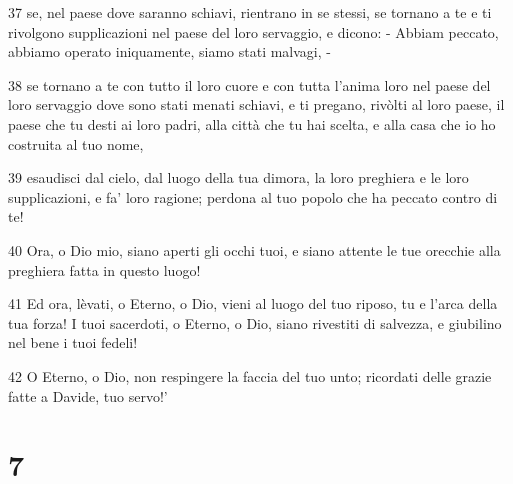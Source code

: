 \par 37 se, nel paese dove saranno schiavi, rientrano in se stessi, se tornano a te e ti rivolgono supplicazioni nel paese del loro servaggio, e dicono: - Abbiam peccato, abbiamo operato iniquamente, siamo stati malvagi, -
\par 38 se tornano a te con tutto il loro cuore e con tutta l'anima loro nel paese del loro servaggio dove sono stati menati schiavi, e ti pregano, rivòlti al loro paese, il paese che tu desti ai loro padri, alla città che tu hai scelta, e alla casa che io ho costruita al tuo nome,
\par 39 esaudisci dal cielo, dal luogo della tua dimora, la loro preghiera e le loro supplicazioni, e fa' loro ragione; perdona al tuo popolo che ha peccato contro di te!
\par 40 Ora, o Dio mio, siano aperti gli occhi tuoi, e siano attente le tue orecchie alla preghiera fatta in questo luogo!
\par 41 Ed ora, lèvati, o Eterno, o Dio, vieni al luogo del tuo riposo, tu e l'arca della tua forza! I tuoi sacerdoti, o Eterno, o Dio, siano rivestiti di salvezza, e giubilino nel bene i tuoi fedeli!
\par 42 O Eterno, o Dio, non respingere la faccia del tuo unto; ricordati delle grazie fatte a Davide, tuo servo!'

\chapter{7}

